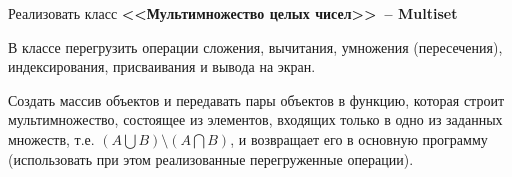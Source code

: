 Реализовать класс \textbf{<<Мультимножество целых чисел>>~-- Multiset}

В классе перегрузить операции сложения,
вычитания, умножения (пересечения), индексирования, присваивания и вывода на экран.

Создать массив объектов и передавать пары объектов в функцию, которая строит
мультимножество, состоящее из элементов, входящих только в одно из заданных
множеств, т.е. $(A\bigcup B) \setminus (A\bigcap B)$, и возвращает его в основную программу (использовать при
этом реализованные перегруженные операции).
